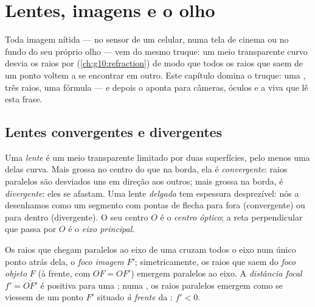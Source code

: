 \chapter{Lentes, imagens e o olho}\label{ch:g11:lenses-and-eye}

Toda imagem nítida --- no sensor de um celular, numa tela de cinema ou no
fundo do seu próprio olho --- vem do mesmo truque: um meio transparente
curvo desvia os raios por  (\cref{ch:g10:refraction}) de modo que
todos os raios que saem de um ponto voltem a se encontrar em outro. Este
capítulo domina o truque: uma , três raios, uma fórmula --- e depois
o aponta para câmeras, óculos e a  viva que lê esta frase.

\section{Lentes convergentes e divergentes}

\begin{definition}\label{def:g11:lenses-and-eye:lens}
Uma \emph{lente} é um meio transparente limitado por duas
superfícies, pelo menos uma delas curva. Mais grossa no centro do que na
borda, ela é \emph{convergente}: raios paralelos
são desviados uns em direção aos outros; mais grossa na borda, é
\emph{divergente}: eles se afastam. Uma lente
\emph{delgada} tem espessura desprezível: nós a
desenhamos como um segmento com pontas de flecha para fora (convergente)
ou para dentro (divergente). O seu centro $O$ é o \emph{centro
óptico}; a reta perpendicular que passa por $O$ é o
\emph{eixo principal}.
\end{definition}

\begin{definition}\label{def:g11:lenses-and-eye:focal}
Os raios que chegam paralelos ao eixo de uma  cruzam
todos o eixo num único ponto atrás dela, o \emph{foco imagem}
$F'$; simetricamente, os raios que saem do \emph{foco objeto} $F$ (à
frente, com $OF = OF'$) emergem paralelos ao eixo. A \emph{distância
focal} $f' = \overline{OF'}$ é positiva para uma
; numa , os raios paralelos emergem como
se viessem de um ponto $F'$ situado \emph{à frente} da : $f' < 0$.
\end{definition}

